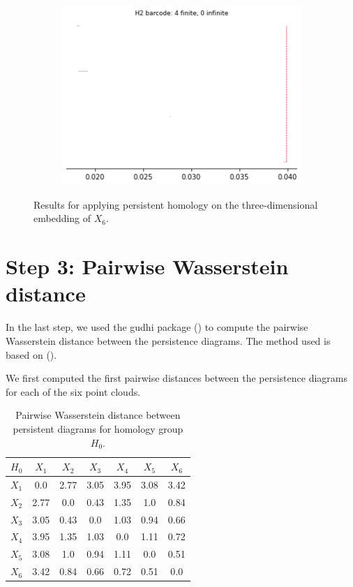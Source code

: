 \begin{figure}[H]
\begin{subfigure}[b]{0.24\textwidth}
\includegraphics[width=\textwidth]{figures/X6_H2_barcode.png}
 \caption{}
\end{subfigure}
\caption{Results for applying persistent homology on the three-dimensional embedding of $X_6$.}
\end{figure}

\section{Step 3: Pairwise Wasserstein distance}
In the last step, we used the gudhi package (\cite{gudhi:urm}) to compute the pairwise Wasserstein distance between the persistence diagrams. The method used is based on (\cite{kerber_geometry_2016}). 

We first computed the first pairwise distances between the persistence diagrams for each of the six point clouds. 

\begin{table}[!htbp]
        \centering
        \small
        \setlength\tabcolsep{5pt}
        \begin{tabular}{|c|c|c|c|c|c|c|}
\hline
 $H_0$& $X_1$ & $X_2$ & $X_3$ & $X_4$ & $X_5$ & $X_6$\\
 \hline
$X_1$ &
0.0&
2.77&
3.05&
3.95&
3.08&
3.42
\\
\hline
$X_2$ &
2.77&
0.0&
0.43&
1.35&
1.0&
0.84
\\
\hline
$X_3$ &
3.05&
0.43&
0.0&
1.03&
0.94&
0.66
\\
\hline
$X_4$ &
3.95&
1.35&
1.03&
0.0&
1.11&
0.72
\\
\hline
$X_5$ &
3.08&
1.0&
0.94&
1.11&
0.0&
0.51
\\
\hline
$X_6$ &
3.42&
0.84&
0.66&
0.72&
0.51&
0.0
\\
\hline
\end{tabular}
\caption{Pairwise Wasserstein distance between persistent diagrams for homology group $H_0$.}
\label{tab:Wass_H0}
\end{table}

